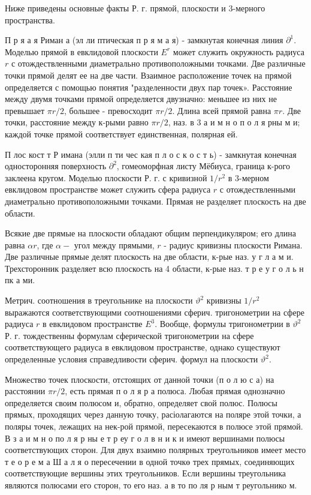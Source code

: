 \documentclass[10pt]{article}
\begin{document}
Ниже приведены основные факты Р. г. прямой, плоскости и 3-мерного пространства.



П р я а я Риман а (эл ли птическая п р я м а я) - замкнутая конечная линия $\partial^{1}$. Моделью прямой в евклидовой плоскости $E^{r}$ может служить окружность радиуса $r$ с отождествленными диаметрально противоположными точками. Две различные точки прямой делят ее на две части. Взаимное расположение точек на прямой определяется с помощью понятия "разделенности двух пар точек». Расстояние между двумя точками прямой определяется двузначно: меньшее из них не превышает $\pi r / 2$, большее - превосходит $\pi r / 2$. Длина всей прямой равна $\pi r$. Две точки, расстояние между к-рыми равно $\pi r / 2$, наз. в 3 а и м н о п о л я рны м и; каждой точке прямой соответствует единственная, полярная ей.



П лос кост т Р имана (элли п ти чес кая п л о с к о с т ь) - замкнутая конечная односторонняя поверхность $\partial^{2}$, гомеоморфная листу Мёбиуса, граница к-рого заклеена кругом. Моделью плоскости Р. г. с кривизной $1 / r^{2}$ в 3-мерном евклидовом пространстве может служить сфера радиуса $r$ с отождествленными диаметрально противоположными точками. Прямая не разделяет плоскость на две области.



Всякие две прямые на плоскости обладают общим перпендикуляром; его длина равна $\alpha r$, где $\alpha-$ угол между прямыми, $r$ - радиус кривизны плоскости Римана. Две различные прямые делят плоскость на две области, к-рые наз. у г л а м и. Трехсторонник разделяет всю плоскость на 4 области, к-рые наз. т р е у г о л ь н пк а ми.



Метрич. соотношения в треугольнике на плоскости $\vartheta^{2}$ кривизны $1 / r^{2}$ выражаются соответствующими соотношениями сферич. тригонометрии на сфере радиуса $r$ в евклидовом пространстве $E^{3}$. Вообще, формулы тригонометрии в $\vartheta^{2}$ Р. г. тождественны формулам сферической тригонометрии на сфере соответствующего радиуса в евклидовом пространстве, однако существуют определенные условия справедливости сферич. формул на плоскости $\vartheta^{2}$.



Множество точек плоскости, отстоящих от данной точки (п о л ю с а) на расстоянии $\pi r / 2$, есть прямая п о л я р а полюса. Любая прямая однозначно определяется своим полюсом и, обратно, определяет свой полюс. Полюсы прямых, проходящих через данную точку, расіолагаются на поляре этой точки, а поляры точек, лежащих на нек-рой прямой, пересекаются в полюсе этой прямой. В з а и м н о по л я р ны е т р еу г о л в н и к и имеют вершинами полюсы соответствующих сторон. Для двух взаимно полярных треугольников имеет место т е о р е м а Ш а л я о пересечении в одной точкө трех прямых, соединяющих соответствующие вершины этих треугольников. Если вершины треугольника являются полюсами его сторон, то его наз. а в то по ля р ным т реугольнико м.
\end{document}
